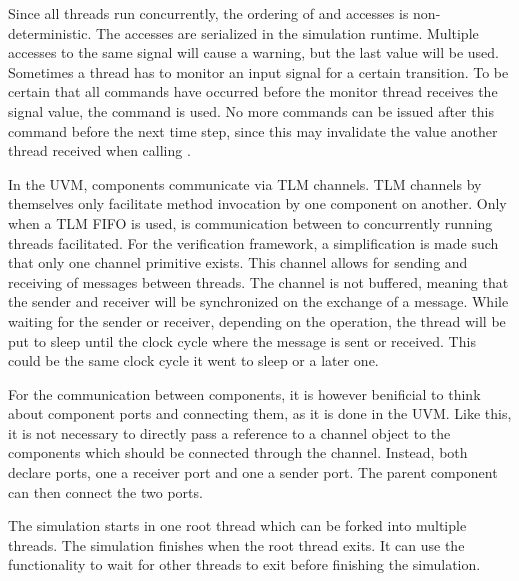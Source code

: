 Since all threads run concurrently, the ordering of  and  accesses is non-deterministic. The
accesses are serialized in the simulation runtime. Multiple  accesses to the same signal will cause a
warning, but the last value will be used. Sometimes a thread has to monitor an input signal for a certain transition.
To be certain that all  commands have occurred before the monitor thread receives the signal value, the
 command is used. No more  commands can be issued after this command before the next time
step, since this may invalidate the value another thread received when calling .

In the UVM, components communicate via TLM channels. TLM channels by themselves only facilitate method invocation by
one component on another. Only when a TLM FIFO is used, is communication between to concurrently running threads
facilitated. For the verification framework, a simplification is made such that only one channel primitive exists. This
channel allows for sending and receiving of messages between threads. The channel is not buffered, meaning that the
sender and receiver will be synchronized
on the exchange of a message. While waiting for the sender or receiver, depending on the operation, the thread will
be put to sleep until the clock cycle where the message is sent or received. This could be the same clock cycle it
went to sleep or a later one.

For the communication between components, it is however benificial to think about component ports and connecting
them, as it is done in the UVM. Like this, it is not necessary to directly pass a reference to a channel object to
the components which should be connected through the channel. Instead, both declare ports, one a receiver port and
one a sender port. The parent component can then connect the two ports.

The simulation starts in one root thread which can be forked into multiple threads. The simulation finishes when the
root thread exits. It can use the  functionality to wait for other threads to exit before finishing the simulation.

